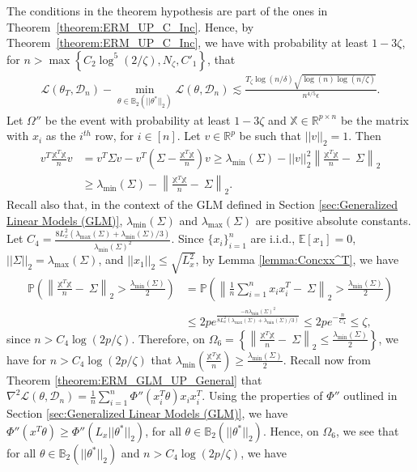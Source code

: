 \documentclass{article}
\begin{document}
The conditions in the theorem hypothesis are part of the ones in Theorem~\ref{theorem:ERM_UP_C_Inc}. Hence, by  Theorem~\ref{theorem:ERM_UP_C_Inc}, we have with probability at least $1 - 3\zeta$, for $n > \max\left\{C_2\log^5(2/\zeta), N_\zeta, C'_1\right\}$, that
\begin{align*}
\mathcal{L}(\theta_T, \mathcal{D}_n) - \mathop{\min}\limits_{\theta \in \mathbb{B}_2(||\theta^*||_2)}\mathcal{L}(\theta, \mathcal{D}_n) \lesssim \frac{T_\zeta\log(n/\delta)\sqrt{\log(n)\log(n/\zeta)}}{n^{4/5}\epsilon}.
\end{align*}
Let $\Omega''$ be the event with probability at least $1 - 3\zeta$ and $\mathbb{X} \in \mathbb{R}^{p \times n}$ be the matrix with $x_i$ as the $i^{th}$ row, for $i \in [n]$. Let $v \in \mathbb{R}^p$ be such that $||v||_2 = 1$. Then
\begin{align*}
v^T\frac{\mathbb{X}^T\mathbb{X}}{n}v &= v^T\Sigma v - v^T\left(\Sigma - \frac{\mathbb{X}^T\mathbb{X}}{n}\right)v \geq \lambda_{\min}\left(\Sigma\right) - ||v||_2^2\left\|\frac{\mathbb{X}^T\mathbb{X}}{n} - \ \Sigma\right\|_2\\
&\geq \lambda_{\min}\left(\Sigma\right) - \left\|\frac{\mathbb{X}^T\mathbb{X}}{n} - \ \Sigma\right\|_2.
\end{align*}
Recall also that, in the context of the GLM defined in Section \ref{sec:Generalized Linear Models (GLM)}, $\lambda_{\min}(\Sigma)$ and $\lambda_{\max}(\Sigma)$ are positive absolute constants. Let $C_4 = \frac{8L_x^2(\lambda_{\max}(\Sigma) + \lambda_{\min}(\Sigma)/3)}{\lambda_{\min}(\Sigma)^2}$. Since $\{x_i\}_{i = 1}^n$ are i.i.d., $\mathbb{E}[x_1] = 0$, $||\Sigma||_2 = \lambda_{\max}\left(\Sigma\right)$, and $||x_1||_2 \leq \sqrt{L_x^2}$, by Lemma \ref{lemma:Concxx^T}, we have
\begin{align*}
\mathbb{P}\left(\left\|\frac{\mathbb{X}^T\mathbb{X}}{n} - \ \Sigma\right\|_2 > \frac{\lambda_{\min}\left(\Sigma\right)}{2}\right) &= \mathbb{P}\left(\left\|\frac{1}{n}\sum_{i = 1}^nx_ix_i^T - \ \Sigma\right\|_2 > \frac{\lambda_{\min}\left(\Sigma\right)}{2}\right)\\
&\leq 2pe^{\frac{-n\lambda_{\min}\left(\Sigma\right)^2}{8L_x^2\left(\lambda_{\max}\left(\Sigma\right)+ \lambda_{\min}\left(\Sigma\right)/3\right)}} \leq 2pe^{-\frac{n}{C_4}} \leq \zeta,
\end{align*}
since $n > C_4\log(2p/\zeta)$. Therefore, on $\Omega_6 = \left\{\left\|\frac{\mathbb{X}^T\mathbb{X}}{n} - \ \Sigma\right\|_2 \leq \frac{\lambda_{\min}\left(\Sigma\right)}{2}\right\}$, we have for $n > C_4\log(2p/\zeta)$ that $\lambda_{\min}\left(\frac{\mathbb{X}^T\mathbb{X}}{n}\right) \geq \frac{\lambda_{\min}(\Sigma)}{2}$. Recall now from Theorem \ref{theorem:ERM_GLM_UP_General} that $\nabla^2\mathcal{L}(\theta, \mathcal{D}_n) = \frac{1}{n}\sum_{i = 1}^n\Phi''(x_i^T\theta)x_ix_i^T$. Using the properties of $\Phi''$ outlined in Section \ref{sec:Generalized Linear Models (GLM)}, we have $\Phi''(x^T\theta) \geq \Phi''(L_x||\theta^*||_2)$, for all $\theta \in \mathbb{B}_2(||\theta^*||_2)$. Hence, on $\Omega_6$, we see that for all $\theta \in \mathbb{B}_2(||\theta^*||_2)$ and $n > C_4\log(2p/\zeta)$, we have
\end{document}
